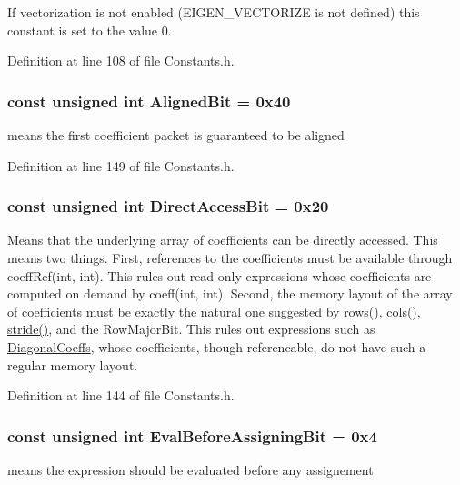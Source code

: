 If vectorization is not enabled (E\-I\-G\-E\-N\-\_\-\-V\-E\-C\-T\-O\-R\-I\-Z\-E is not defined) this constant is set to the value 0. 

Definition at line 108 of file Constants.\-h.

\hypertarget{group__flags_ga972a2dcb6603215fa53e0b9e82051426}{
\subsubsection[{Aligned\-Bit}]{\setlength{\rightskip}{0pt plus 5cm}const unsigned {\bf int} Aligned\-Bit = 0x40}}\label{group__flags_ga972a2dcb6603215fa53e0b9e82051426}
means the first coefficient packet is guaranteed to be aligned 

Definition at line 149 of file Constants.\-h.

\hypertarget{group__flags_ga54c3b872f5a14e7e0d3d6539b704ea67}{
\subsubsection[{Direct\-Access\-Bit}]{\setlength{\rightskip}{0pt plus 5cm}const unsigned {\bf int} Direct\-Access\-Bit = 0x20}}\label{group__flags_ga54c3b872f5a14e7e0d3d6539b704ea67}
Means that the underlying array of coefficients can be directly accessed. This means two things. First, references to the coefficients must be available through coeff\-Ref(int, int). This rules out read-\/only expressions whose coefficients are computed on demand by coeff(int, int). Second, the memory layout of the array of coefficients must be exactly the natural one suggested by rows(), cols(), \hyperlink{glext_8h_a9d21c1b0530d07b637b5b71b969d7921}{stride()}, and the Row\-Major\-Bit. This rules out expressions such as \hyperlink{class_diagonal_coeffs}{Diagonal\-Coeffs}, whose coefficients, though referencable, do not have such a regular memory layout. 

Definition at line 144 of file Constants.\-h.

\hypertarget{group__flags_gadc8925e67a5a54bd479d6f587112e19a}{
\subsubsection[{Eval\-Before\-Assigning\-Bit}]{\setlength{\rightskip}{0pt plus 5cm}const unsigned {\bf int} Eval\-Before\-Assigning\-Bit = 0x4}}\label{group__flags_gadc8925e67a5a54bd479d6f587112e19a}
means the expression should be evaluated before any assignement 

